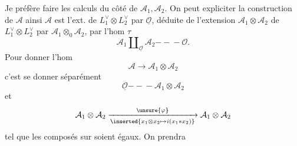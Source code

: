Je préfère faire les calculs du côté de $\mathcal A_1,\mathcal A_2$.
On peut expliciter la construction de $\mathcal A$ ainsi
$\mathcal A$  est l'ext. de $L_1^\vee\otimes L_2^\vee$ par $\underline{\mathcal O}$, déduite de l'extension $\mathcal A_1\otimes\mathcal A_2$ de $L_1^\vee\otimes L_2^\vee$ par $\mathcal A_1\otimes_0\mathcal A_2$, par l'hom $\tau$
\[
\mathcal A_1\amalg_{\underline{\mathcal O}}\mathcal A_2\mathrel{-\!\!-\!\!-}\mathcal O.
\]
Pour donner l'hom
\[
\mathcal A\longrightarrow\mathcal A_1\otimes\mathcal A_2
\]
c'est se donner séparément
\[
\underline{\mathcal O}\mathrel{-\!\!-\!\!-}\mathcal A_1\otimes\mathcal A_2
\]
et
\[
\mathcal A_1\otimes\mathcal A_2\xrightarrow[\inserted{x_1\otimes x_2\mapsto i(x_1*x_2)}]{\unsure{\varphi}}\mathcal A_1\otimes\mathcal A_2
\]
tel que les composés sur
soient égaux. On prendra
